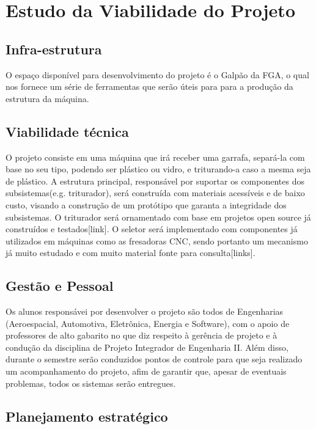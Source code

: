 \section{Estudo da Viabilidade do Projeto}

\subsection{Infra-estrutura}
    O espaço disponível para desenvolvimento do projeto é o Galpão da FGA, o qual nos fornece um série de ferramentas que serão úteis para para a produção da estrutura da máquina.

\subsection{Viabilidade técnica}
    O projeto consiste em uma máquina que irá receber uma garrafa, separá-la com base no seu tipo, podendo ser plástico ou vidro, e triturando-a caso a mesma seja de plástico. A estrutura principal, responsável por suportar os componentes dos subsistemas(e.g. triturador), será construída com materiais acessíveis e de baixo custo, visando a construção de um protótipo que garanta a integridade dos subsistemas. O triturador será ornamentado com base em projetos open source já construídos e testados[link]. O seletor será implementado com componentes já utilizados em máquinas como as fresadoras CNC, sendo portanto um mecanismo já muito estudado e com muito material fonte para consulta[links].

\subsection{Gestão e Pessoal}
    Os alunos responsávei por desenvolver o projeto são todos de Engenharias (Aeroespacial, Automotiva, Eletrônica, Energia e Software), com o apoio de professores de alto gabarito no que diz respeito à gerência de projeto e à condução da disciplina de Projeto Integrador de Engenharia II. Além disso, durante o semestre serão conduzidos pontos de controle para que seja realizado um acompanhamento do projeto, afim de garantir que, apesar de eventuais problemas, todos os sistemas serão entregues.

\subsection{Planejamento estratégico}

